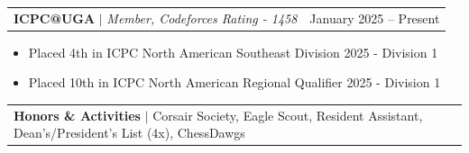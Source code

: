 \documentclass[letterpaper,11pt]{article}
\makeatletter
\newcommand{\resumeItem}[1]{
  \item\small{
    {#1 \vspace{-2pt}}
  }
}
\newcommand{\resumeProjectHeading}[2]{
    \item
    \begin{tabular*}{0.97\textwidth}{l@{\extracolsep{\fill}}r}
      \small#1 & #2 \\
    \end{tabular*}\vspace{-7pt}
}
\newcommand{\resumeSubHeadingListEnd}{\end{itemize}}
\newcommand{\resumeItemListStart}{\begin{itemize}}
\newcommand{\resumeItemListEnd}{\end{itemize}\vspace{-3pt}}
\makeatother
\begin{document}
      \resumeProjectHeading
          {\textbf{ICPC@UGA} $|$ \emph{Member, Codeforces Rating - 1458}}{January 2025 -- Present}  
          \resumeItemListStart  
            \resumeItem{Placed 4th in ICPC North American Southeast Division 2025 - Division 1}
            \resumeItem{Placed 10th in ICPC North American Regional Qualifier 2025 - Division 1}
          \resumeItemListEnd  
      
      \resumeProjectHeading
        {\textbf{Honors \& Activities} $|$ {Corsair Society, Eagle Scout, Resident Assistant, Dean's/President's List (4x), ChessDawgs}}
    
    \resumeSubHeadingListEnd
\end{document}

